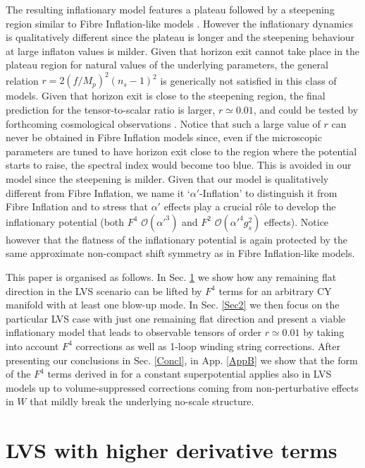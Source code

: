 \documentclass[11pt,a4paper]{article}
\newcommand{\mc}{\mathcal}
\begin{document}
The resulting inflationary model features a plateau followed by a steepening region similar to Fibre Inflation-like models \cite{Cicoli:2008gp, Broy:2015zba}. However the inflationary dynamics is qualitatively different since the plateau is longer and the steepening behaviour at large inflaton values is milder. Given that horizon exit cannot take place in the plateau region for natural values of the underlying parameters, the general relation $r= 2 (f/M_p)^2 (n_s-1)^2$ is generically not satisfied in this class of models. Given that horizon exit is close to the steepening region, the final prediction for the tensor-to-scalar ratio is larger, $r\simeq 0.01$, and could be tested by forthcoming cosmological observations \cite{rForecasts}. Notice that such a large value of $r$ can never be obtained in Fibre Inflation models since, even if the microscopic parameters are tuned to have horizon exit close to the region where the potential starts to raise, the spectral index would become too blue. This is avoided in our model since the steepening is milder. Given that our model is qualitatively different from Fibre Inflation, we name it `$\alpha'$-Inflation' to distinguish it from Fibre Inflation and to stress that $\alpha'$ effects play a crucial r\^ole to develop the inflationary potential (both $F^4$ $\mc{O}(\alpha'^3)$ and $F^2$ $\mc{O}(\alpha'^4 g_s^2)$ effects). Notice however that the flatness of the inflationary potential is again protected by the same approximate non-compact shift symmetry as in Fibre Inflation-like models. 

This paper is organised as follows. In Sec. \ref{Section1} we show how any remaining flat direction in the LVS scenario can be lifted by $F^4$ terms for an arbitrary CY manifold with at least one blow-up mode. In Sec. \ref{Sec2} we then focus on the particular LVS case with just one remaining flat direction and present a viable inflationary model that leads to observable tensors of order $r\simeq 0.01$ by taking into account $F^4$ corrections as well as 1-loop winding string corrections. After presenting our conclusions in Sec. \ref{Concl}, in App. \ref{AppB} we show that the form of the $F^4$ terms derived in \cite{Ciupke:2015msa} for a constant superpotential applies also in LVS models up to volume-suppressed corrections coming from non-perturbative effects in $W$ that mildly break the underlying no-scale structure.



\section{LVS with higher derivative terms}
\label{Section1}
\end{document}
